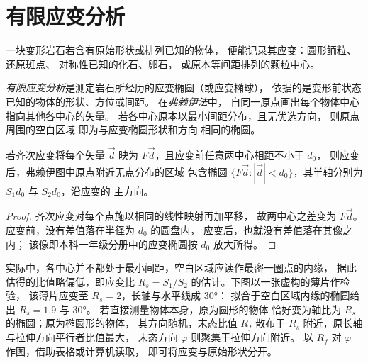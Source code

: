 \section{有限应变分析}\label{sec:b3:structural-analysis:strain}

一块变形岩石若含有原始形状或排列已知的物体，
便能记录其应变：圆形鲕粒、还原斑点、
对称性已知的化石、卵石，
或原本等间距排列的颗粒中心。

\begin{definition}\label{def:b3:structural-analysis:strain-analysis}
\emph{有限应变分析}是测定岩石所经历的应变椭圆（或应变椭球），
依据的是变形前状态已知的物体的形状、方位或间距。
在\emph{弗赖伊法}中，
自同一原点画出每个物体中心指向其他各中心的矢量。
若各中心原本以最小间距分布，且无优选方向，
则原点周围的空白区域
即为与应变椭圆形状和方向
相同的椭圆。
\end{definition}

\begin{proposition}[弗赖伊空区]\label{prop:b3:structural-analysis:fry}
若齐次应变将每个矢量 $\vec d$ 映为 $F\vec d$，且应变前任意两中心相距不小于 $d_0$，
则应变后，弗赖伊图中原点附近无点分布的区域
包含椭圆
$\{F\vec d : |\vec d| < d_0\}$，其半轴分别为 $S_1d_0$ 与 $S_2d_0$，沿应变的
主方向。
\end{proposition}

\begin{proof}
齐次应变对每个点施以相同的线性映射再加平移，
故两中心之差变为 $F\vec d$。应变前，没有差值落在半径为 $d_0$ 的圆盘内，
应变后，也就没有差值落在其像之内；
该像即本科一年级分册中的应变椭圆按 $d_0$ 放大所得。
\end{proof}

实际中，各中心并不都处于最小间距，空白区域应读作最密一圈点的内缘，
据此估得的比值略偏低，即应变比 $R_s = S_1/S_2$ 的估计。下图以一张虚构的薄片作检验，
该薄片应变至 $R_s = 2$，长轴与水平线成 \ang{30}：
拟合于空白区域内缘的椭圆给出
$R_s = 1.9$ 与 \ang{30}。
若直接测量物体本身，原为圆形的物体
恰好变为轴比为 $R_s$ 的椭圆；原为椭圆形的物体，
其方向随机，末态比值 $R_f$ 散布于
$R_s$ 附近，原长轴与拉伸方向平行者比值最大，
末态方向 $\varphi$ 则聚集于拉伸方向附近。
以 $R_f$ 对 $\varphi$ 作图，借助表格或计算机读取，
即可将应变与原始形状分开。

